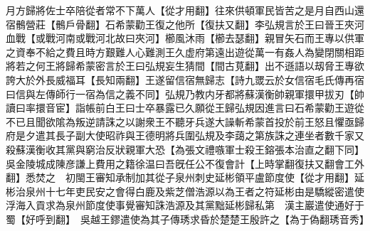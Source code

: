 月方歸將佐士卒陪從者常不下萬人【從才用翻】往來供頓軍民皆苦之是月自西山還宿鶻營莊【鶻戶骨翻】石希蒙勸王復之他所【復扶又翻】李弘規言於王曰晉王夾河血戰【或戰河南或戰河北故曰夾河】櫛風沐雨【櫛去瑟翻】親冒矢石而王專以供軍之資奉不給之費且時方艱難人心難測王久虚府第遠出遊從萬一有姦人為變閉關相距將若之何王將歸希蒙密言於王曰弘規妄生猜間【間古莧翻】出不遜語以刼脅王專欲誇大於外長威福耳【長知兩翻】王遂留信宿無歸志【詩九罭云於女信宿毛氏傳再宿曰信與左傳師行一宿為信之義不同】弘規乃教内牙都將蘇漢衡帥親軍擐甲拔刃【帥讀曰率擐音宦】詣帳前白王曰士卒暴露已久願從王歸弘規因進言曰石希蒙勸王遊從不已且聞欲隂為叛逆請誅之以謝衆王不聽牙兵遂大譟斬希蒙首投於前王怒且懼亟歸府是夕遣其長子副大使昭祚與王德明將兵圍弘規及李藹之第族誅之連坐者數千家又殺蘇漢衡收其黨與窮治反狀親軍大恐【為張文禮嗾軍士殺王鎔張本治直之翻下同】　吳金陵城成陳彦謙上費用之籍徐温曰吾旣任公不復會計【上時掌翻復扶又翻會工外翻】悉焚之　初閩王審知承制加其從子泉州刺史延彬領平盧節度使【從才用翻】延彬治泉州十七年吏民安之會得白鹿及紫芝僧浩源以為王者之符延彬由是驕縱密遣使浮海入貢求為泉州節度使事覺審知誅浩源及其黨黜延彬歸私第　漢主巖遣使通好于蜀【好呼到翻】　吳越王鏐遣使為其子傳琇求昏於楚楚王殷許之【為于偽翻琇音秀】

